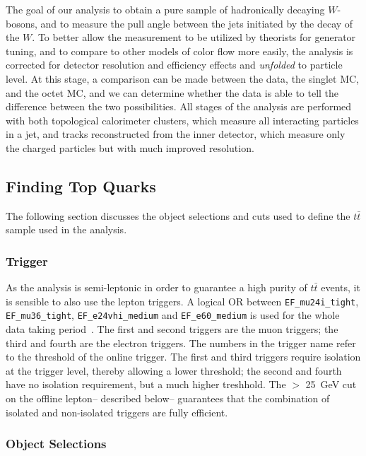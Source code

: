 The goal of our analysis to obtain a pure sample of hadronically decaying $W$-bosons, and to measure the pull angle between the jets initiated by the decay of the $W$. To better allow the measurement to be utilized by theorists for generator tuning, and to compare to other models of color flow more easily, the analysis is corrected for detector resolution and efficiency effects and \textit{unfolded} to particle level. At this stage, a comparison can be made between the data, the singlet MC, and the octet MC, and we can determine whether the data is able to tell the difference between the two possibilities. All stages of the analysis are performed with both topological calorimeter clusters, which measure all interacting particles in a jet, and tracks reconstructed from the inner detector, which measure only the charged particles but with much improved resolution.

\subsection{Finding Top Quarks}

The following section discusses the object selections and cuts used to define the $t\bar{t}$ sample used in the analysis.

\subsubsection{Trigger}

As the analysis is semi-leptonic in order to guarantee a high purity of $t\bar{t}$ events, it is sensible to also use the lepton triggers. A logical OR between {\tt EF\_mu24i\_tight}, {\tt EF\_mu36\_tight}, {\tt EF\_e24vhi\_medium} and {\tt EF\_e60\_medium} is used for the whole data taking period~\cite{ATLAS-CONF-2012-099,Pasztor:1706278}. The first and second triggers are the muon triggers; the third and fourth are the electron triggers. The numbers in the trigger name refer to the \pt threshold of the online trigger. The first and third triggers require isolation at the trigger level, thereby allowing a lower \pt threshold; the second and fourth have no isolation requirement, but a much higher \pt treshhold. The \pt $>$ 25~GeV cut on the offline lepton-- described below-- guarantees that the combination of isolated and non-isolated triggers are fully efficient.

\subsubsection{Object Selections}

